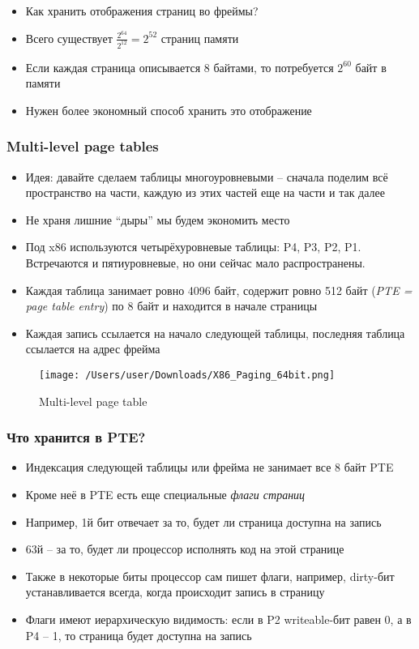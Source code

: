     \begin{itemize}
      \item Как хранить отображения страниц во фреймы?
      \item Всего существует $\frac{2^{64}}{2^{12}} = 2^{52}$ страниц памяти
      \item Если каждая страница описывается 8 байтами, то потребуется $2^{60}$ байт в памяти
      \item Нужен более экономный способ хранить это отображение
    \end{itemize}
  
  \subsubsection{Multi-level page tables}
    \begin{itemize}
      \item Идея: давайте сделаем таблицы многоуровневыми -- сначала поделим всё пространство на части, каждую из этих частей еще на части и так далее
      \item Не храня лишние ``дыры'' мы будем экономить место
      \item Под x86 используются четырёхуровневые таблицы: P4, P3, P2, P1. Встречаются и пятиуровневые, но они сейчас мало распространены.
      \item Каждая таблица занимает ровно 4096 байт, содержит ровно 512 байт (\textit{PTE = page table entry}) по 8 байт и находится в начале страницы
      \item Каждая запись ссылается на начало следующей таблицы, последняя таблица ссылается на адрес фрейма
    \end{itemize}
    
\begin{figure}[h!]
  \texttt{[image: /Users/user/Downloads/X86\_Paging\_64bit.png]}
  \caption{Multi-level page table}
  \label{fig:page_table}
\end{figure}  
  
  \subsubsection{Что хранится в PTE?}
    \begin{itemize}
      \item Индексация следующей таблицы или фрейма не занимает все 8 байт PTE
      \item Кроме неё в PTE есть еще специальные \textit{флаги страниц}
      \item Например, 1й бит отвечает за то, будет ли страница доступна на запись
      \item 63й -- за то, будет ли процессор исполнять код на этой странице
      \item Также в некоторые биты процессор сам пишет флаги, например, dirty-бит устанавливается всегда, когда происходит запись в страницу
      \item Флаги имеют иерархическую видимость: если в P2 writeable-бит равен 0, а в P4 -- 1, то страница будет доступна на запись
    \end{itemize}
  
